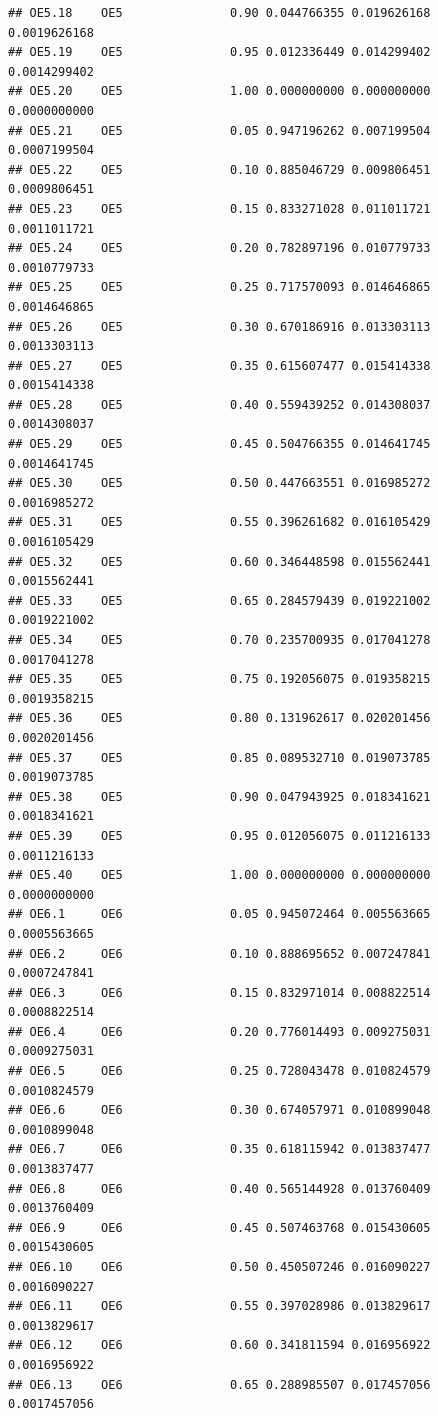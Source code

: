 \documentclass[
]{book}
\begin{document}
\begin{verbatim}
## OE5.18    OE5               0.90 0.044766355 0.019626168 0.0019626168
## OE5.19    OE5               0.95 0.012336449 0.014299402 0.0014299402
## OE5.20    OE5               1.00 0.000000000 0.000000000 0.0000000000
## OE5.21    OE5               0.05 0.947196262 0.007199504 0.0007199504
## OE5.22    OE5               0.10 0.885046729 0.009806451 0.0009806451
## OE5.23    OE5               0.15 0.833271028 0.011011721 0.0011011721
## OE5.24    OE5               0.20 0.782897196 0.010779733 0.0010779733
## OE5.25    OE5               0.25 0.717570093 0.014646865 0.0014646865
## OE5.26    OE5               0.30 0.670186916 0.013303113 0.0013303113
## OE5.27    OE5               0.35 0.615607477 0.015414338 0.0015414338
## OE5.28    OE5               0.40 0.559439252 0.014308037 0.0014308037
## OE5.29    OE5               0.45 0.504766355 0.014641745 0.0014641745
## OE5.30    OE5               0.50 0.447663551 0.016985272 0.0016985272
## OE5.31    OE5               0.55 0.396261682 0.016105429 0.0016105429
## OE5.32    OE5               0.60 0.346448598 0.015562441 0.0015562441
## OE5.33    OE5               0.65 0.284579439 0.019221002 0.0019221002
## OE5.34    OE5               0.70 0.235700935 0.017041278 0.0017041278
## OE5.35    OE5               0.75 0.192056075 0.019358215 0.0019358215
## OE5.36    OE5               0.80 0.131962617 0.020201456 0.0020201456
## OE5.37    OE5               0.85 0.089532710 0.019073785 0.0019073785
## OE5.38    OE5               0.90 0.047943925 0.018341621 0.0018341621
## OE5.39    OE5               0.95 0.012056075 0.011216133 0.0011216133
## OE5.40    OE5               1.00 0.000000000 0.000000000 0.0000000000
## OE6.1     OE6               0.05 0.945072464 0.005563665 0.0005563665
## OE6.2     OE6               0.10 0.888695652 0.007247841 0.0007247841
## OE6.3     OE6               0.15 0.832971014 0.008822514 0.0008822514
## OE6.4     OE6               0.20 0.776014493 0.009275031 0.0009275031
## OE6.5     OE6               0.25 0.728043478 0.010824579 0.0010824579
## OE6.6     OE6               0.30 0.674057971 0.010899048 0.0010899048
## OE6.7     OE6               0.35 0.618115942 0.013837477 0.0013837477
## OE6.8     OE6               0.40 0.565144928 0.013760409 0.0013760409
## OE6.9     OE6               0.45 0.507463768 0.015430605 0.0015430605
## OE6.10    OE6               0.50 0.450507246 0.016090227 0.0016090227
## OE6.11    OE6               0.55 0.397028986 0.013829617 0.0013829617
## OE6.12    OE6               0.60 0.341811594 0.016956922 0.0016956922
## OE6.13    OE6               0.65 0.288985507 0.017457056 0.0017457056

\end{verbatim}
\end{document}
